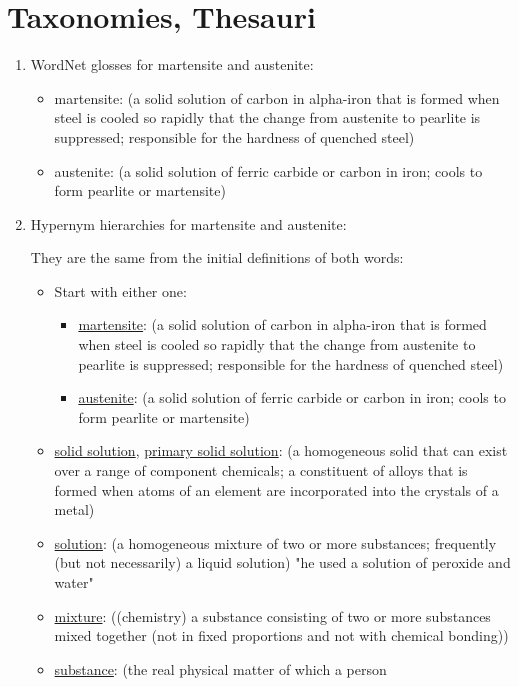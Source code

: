 \documentclass[12pt]{report}
\begin{document}
\section{Taxonomies, Thesauri}
\begin{enumerate}
  \item WordNet glosses for martensite and austenite:
  \begin{itemize}
    \item martensite: (a solid solution of carbon in alpha-iron that is formed
    when steel is cooled so rapidly that the change from austenite to pearlite
    is suppressed; responsible for the hardness of quenched steel)
    \item austenite: (a solid solution of ferric carbide or carbon in iron;
    cools to form pearlite or martensite)
  \end{itemize}
  \item Hypernym hierarchies for martensite and austenite:\par
  They are the same from the initial definitions of both words:
  \begin{itemize}
    \item Start with either one:
    \begin{itemize}
      \item \underline{martensite}: (a solid solution of carbon in alpha-iron
      that is formed when steel is cooled so rapidly that the change from
      austenite to pearlite is suppressed; responsible for the hardness of
      quenched steel)
      \item \underline{austenite}: (a solid solution of ferric carbide or
      carbon in iron; cools to form pearlite or martensite)
    \end{itemize}
    \item \underline{solid solution}, \underline{primary solid solution}:
    (a homogeneous solid that can exist over a range of component chemicals;
    a constituent of alloys that is formed when atoms of an element are
    incorporated into the crystals of a metal)
    \item \underline{solution}: (a homogeneous mixture of two or more
    substances; frequently (but not necessarily) a liquid solution)
    "he used a solution of peroxide and water"
    \item \underline{mixture}: ((chemistry) a substance consisting of two or
    more substances mixed together (not in fixed proportions and not with
    chemical bonding))
    \item \underline{substance}: (the real physical matter of which a person

\end{itemize}
\end{enumerate}
\end{document}
